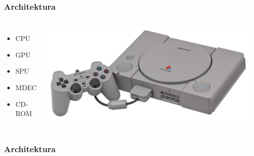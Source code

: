 \begin{frame}
  \frametitle{Architektura}
  \begin{columns}
    \begin{itemize}
      \item CPU
      \item GPU
      \item SPU
      \item MDEC
      \item CD-ROM
    \end{itemize}
      \includegraphics[width=\textwidth]{img/psx-console.jpg}
  \end{columns}
\end{frame}

\begin{frame}\frametitle{Architektura}
\end{frame}


